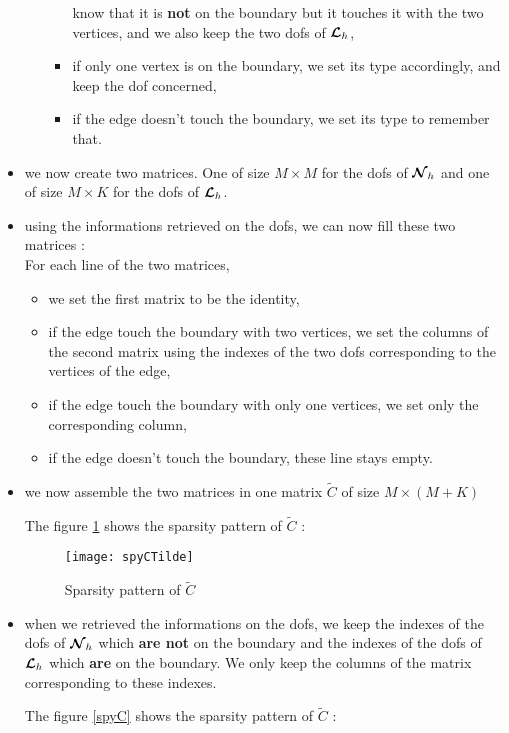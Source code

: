 \begin{itemize}
\begin{itemize}
\begin{itemize}
  know that it is {\bf not} on the boundary but it touches it with the two
  vertices, and we also keep the two dofs of ${\bm{\mathcal{L}}}_h$,
\item if only one vertex is on the boundary, we set its type accordingly, and
  keep the dof concerned,
\item if the edge doesn't touch the boundary, we set its type to remember that.
\end{itemize}
\end{itemize}
\item we now create two matrices. One of size $M\times M$ for the dofs of ${\bm{\mathcal{N}}}_h$ and one of size $M\times K$ for the dofs of ${\bm{\mathcal{L}}}_h$.

\item using the informations retrieved on the dofs, we can now fill these two
  matrices :\\
For each line of the two matrices,
\begin{itemize}
\item we set the first matrix to be the identity,
\item if the edge touch the boundary with two vertices, we set the columns of
  the second matrix using the indexes of the two dofs corresponding to the
  vertices of the edge,
\item if the edge touch the boundary with only one vertices, we set only the
  corresponding column,
\item if the edge doesn't touch the boundary, these line stays empty. 
\end{itemize}

\item we now assemble the two matrices in one matrix $\tilde{C}$ of size $M\times (M+K)$

The figure \ref{spyCTilde} shows the sparsity pattern of $\tilde{C}$ : 
\begin{figure}[H]
\centering
\texttt{[image: spyCTilde]}
\caption{Sparsity pattern of $\tilde{C}$}
\label{spyCTilde}
\end{figure}
\item when we retrieved the informations on the dofs, we keep the indexes of the dofs of ${\bm{\mathcal{N}}}_h$ which {\bf are not} on the boundary and the indexes of the dofs of ${\bm{\mathcal{L}}}_h$ which {\bf are} on the boundary. We only keep the columns of the matrix corresponding to these indexes.

The figure \ref{spyC} shows the sparsity pattern of $\tilde{C}$ : 

\end{itemize}
